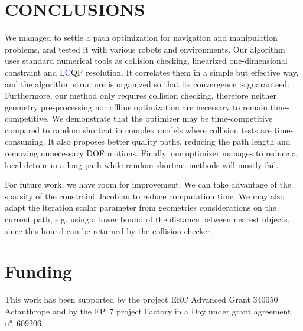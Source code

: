 \documentclass{tADR2e}
\begin{document}
\section{CONCLUSIONS}
We managed to settle a path optimization for navigation and manipulation problems, and tested it with various robots and environments. Our algorithm uses standard 
numerical tools as collision checking, linearized one-dimensional constraint
and \textcolor{blue}{LC}QP resolution. It correlates them in a 
simple but effective way, and the algorithm structure is organized so that its 
convergence is guaranteed. Furthermore, 
our method only requires collision checking, therefore neither 
geometry pre-processing nor 
offline optimization are necessary to remain time-competitive. We demonstrate 
that the optimizer may be 
time-competitive compared to random shortcut in complex models where collision tests 
are time-consuming. 
It also proposes better quality paths, reducing the path length and removing 
unnecessary DOF motions. 
Finally, our optimizer manages to reduce a local detour in a long path while random 
shortcut methods will mostly fail.

For future work, we have room for improvement. We can take advantage of the sparsity of 
the constraint Jacobian to reduce computation time. We may also adapt the iteration 
scalar parameter from geometries considerations on the current path, e.g. using a lower 
bound of the distance between nearest objects, since this bound can be returned by 
the collision checker.

\section*{Funding}
This work has been supported by the project ERC Advanced Grant 340050 Actanthrope and by the FP~7 project Factory in a Day under grant agreement n°~609206.
\end{document}
